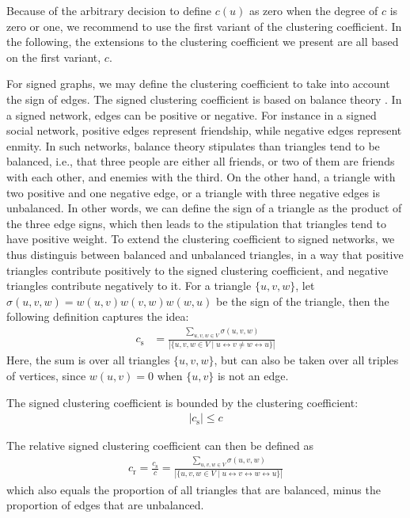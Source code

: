 \documentclass{article}
\begin{document}
Because of the arbitrary decision to define $c(u)$ as zero when the
degree of $c$ is zero or one, we recommend to use the first variant of
the clustering coefficient.  In the following, the extensions to the
clustering coefficient we present are all based on the first variant,
$c$.

For signed graphs, we may define the clustering coefficient to take into
account the sign of edges.  The signed clustering coefficient is based
on balance theory \citep{kunegis:slashdot-zoo}.  In a signed network,
edges can be positive or negative.  For instance in a signed social
network, positive edges represent friendship, while negative edges
represent enmity.  In such networks, balance theory stipulates than
triangles tend to be balanced, i.e., that three people are either all
friends, or two of them are friends with each other, and enemies with
the third.  On the other hand, a triangle with two positive and one
negative edge, or a triangle with three negative edges is unbalanced.
In other words, we can define the sign of a triangle as the product of
the three edge signs, which then leads to the stipulation that triangles
tend to have positive weight.  To extend the clustering coefficient to
signed networks, we thus distinguis between balanced and unbalanced
triangles, in a way that positive triangles contribute positively to the
signed clustering coefficient, and negative triangles contribute
negatively to it.  For a triangle $\{u,v,w\}$, let
$\sigma(u,v,w)=w(u,v)w(v,w)w(w,u)$ be the sign of the triangle, then the
following definition captures the idea:
\begin{align}
  c_{\mathrm s} &= \frac {\sum_{u,v,w\in V} \sigma(u,v,w)} {|\{ u, v, w
    \in V \mid u \leftrightarrow v \neq w \leftrightarrow u \}|}
\end{align}
Here, the sum is over all triangles $\{u,v,w\}$, but can also be taken
over all triples of vertices, since $w(u,v)=0$ when $\{u,v\}$ is not an
edge.

The signed clustering coefficient is bounded by the clustering
coefficient:
\begin{align}
  | c_{\mathrm s} | \leq c
\end{align}

The relative signed clustering coefficient can then be defined as
\begin{align}
  c_{\mathrm r} = \frac {c_{\mathrm s}} c = \frac {\sum_{u,v,w\in V}
    \sigma(u,v,w)} {|\{ u, v, w \in V \mid u \leftrightarrow v \leftrightarrow w \leftrightarrow u \}|}
\end{align}
which also equals the proportion of all triangles that are balanced,
minus the proportion of edges that are unbalanced.
\end{document}
